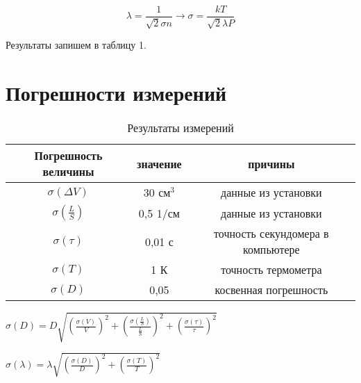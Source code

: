 \documentclass[a4paper,12pt]{article}
\theoremstyle{plain} %
\theoremstyle{definition} %
\theoremstyle{remark} %
\begin{document}
        \[\lambda = \frac{1}{\sqrt{2}\sigma n} \rightarrow \sigma = \frac{kT}{\sqrt{2}\lambda P} \]
        
        Результаты запишем в таблицу 1.
    
\section{Погрешности измерений}
    \begin{table}[!h]
        \begin{center}
            \begin{tabular}{|c|c|c|}
            \hline
            Погрешность величины    & значение      &   причины \\ \hline
            $\sigma (\Delta V)$     &   30 см$^3$   &   данные из установки \\
            $\sigma (\frac{L}{S})$  &   0,5 1/см    &	данные из установки	\\
            $\sigma (\tau)$	        &	0,01 с	    &	точность секундомера в компьютере \\
            $\sigma (T)$            &   1 К         &   точность термометра \\
            $\sigma (D)$	        &	0,05	    &   косвенная погрешность\\	
            \hline
            \end{tabular}
        \caption{ Результаты измерений}
        \end{center}
    \end{table}
    
    \begin{center}
        $\sigma(D) = D \sqrt{(\frac{\sigma(V)}{V})^2 + (\frac{\sigma(\frac{L}{S})}{ \frac{L}{S} })^2 + (\frac{\sigma(\tau)}{\tau})^2}$   
    \end{center}
    
    \begin{center}
        $\sigma(\lambda) = \lambda\sqrt{(\frac{\sigma(D)}{D})^2 + (\frac{\sigma(T)}{T})^2}$
    \end{center}
        
\end{document}
